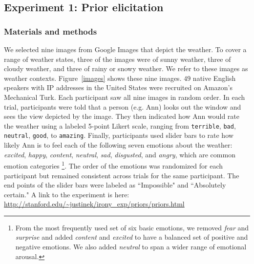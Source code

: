 \documentclass[10pt,letterpaper]{article}
\begin{document}


\subsection{Experiment 1: Prior elicitation}
\subsubsection{Materials and methods}
We selected nine images from Google Images that depict the weather. To cover a range of weather states, three of the images were of sunny weather, three of cloudy weather, and three of rainy or snowy weather. We refer to these images as weather contexts. Figure~\ref{images} shows these nine images.
$49$ native English speakers with IP addresses in the United States were recruited on Amazon's Mechanical Turk. Each participant saw all nine images in random order. In each trial, participants were told that a person (e.g. Ann) looks out the window and sees the view depicted by the image. They then indicated how Ann would rate the weather using a labeled 5-point Likert scale, ranging from \texttt{terrible}, \texttt{bad}, \texttt{neutral}, \texttt{good}, to \texttt{amazing}. Finally, participants used slider bars to rate how likely Ann is to feel each of the following seven emotions about the weather: \emph{excited}, \emph{happy}, \emph{content}, \emph{neutral}, \emph{sad}, \emph{disgusted}, and \emph{angry}, which are common emotion categories \cite{ekman1992argument}\footnote{From the most frequently used set of six basic emotions, we removed \emph{fear} and \emph{surprise} and added \emph{content} and \emph{excited} to have a balanced set of positive and negative emotions. We also added \emph{neutral} to span a wider range of emotional arousal.}.
The order of the emotions was randomized for each participant but remained consistent across trials for the same participant. The end points of the slider bars were labeled as ``Impossible" and ``Absolutely certain." A link to the experiment is here: \url{http://stanford.edu/~justinek/irony_exp/priors/priors.html}
  
\end{document}
